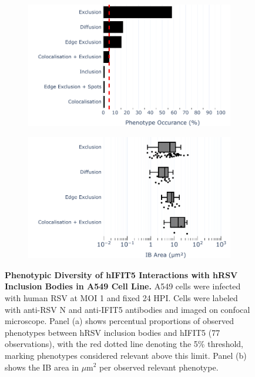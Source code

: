 \begin{figure}
    \begin{subfigure}{0.495\textwidth}
        \caption{}
        \includegraphics[width=1\linewidth]{08. Chapter 3/Figs/02. Infection/04. IFIT5/01. bar_i5_a549.pdf} 
    \end{subfigure}
    \begin{subfigure}{0.495\textwidth}
        \caption{}
        \includegraphics[width=1\linewidth]{08. Chapter 3/Figs/02. Infection/04. IFIT5/02. box_i5_a549.pdf}
    \end{subfigure}
    \caption[Phenotypic Diversity of hIFIT5 Interactions with hRSV Inclusion Bodies in A549 Cell Line.]{\textbf{Phenotypic Diversity of hIFIT5 Interactions with hRSV Inclusion Bodies in A549 Cell Line.} A549 cells were infected with human RSV at MOI 1 and fixed 24 HPI. Cells were labeled with anti-RSV N and anti-IFIT5 antibodies and imaged on confocal microscope. Panel (a) shows percentual proportions of observed phenotypes between hRSV inclusion bodies and hIFIT5 (77 observations), with the red dotted line denoting the 5\% threshold, marking phenotypes considered relevant above this limit. Panel (b) shows the IB area in \(\mu \mbox{m}^2\) per observed relevant phenotype.}
    \label{fig:Phenotypic Diversity of hIFIT5 Interactions with hRSV Inclusion Bodies in A549 Cell Line}
\end{figure}

